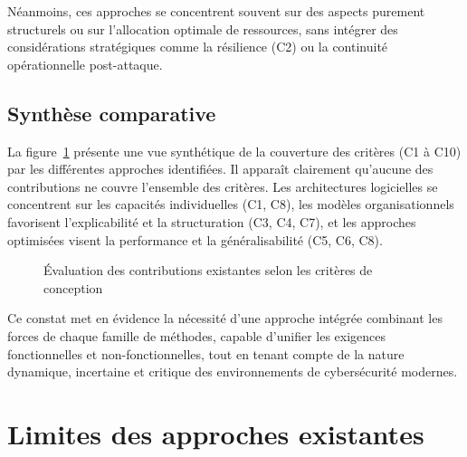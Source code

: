 \documentclass[ twoside,openright,titlepage,numbers=noenddot,headinclude,%
                footinclude=true,cleardoublepage=empty,abstractoff, %
                BCOR=5mm,paper=a4,fontsize=11pt,%
                french,american,%
                ]{scrreprt}
\begin{document}
Néanmoins, ces approches se concentrent souvent sur des aspects purement structurels ou sur l'allocation optimale de ressources, sans intégrer des considérations stratégiques comme la résilience (C2) ou la continuité opérationnelle post-attaque.

\subsection*{Synthèse comparative}

La figure~\ref{fig:revue-couverture-criteres} présente une vue synthétique de la couverture des critères (C1 à C10) par les différentes approches identifiées. Il apparaît clairement qu'aucune des contributions ne couvre l'ensemble des critères. Les architectures logicielles se concentrent sur les capacités individuelles (C1, C8), les modèles organisationnels favorisent l'explicabilité et la structuration (C3, C4, C7), et les approches optimisées visent la performance et la généralisabilité (C5, C6, C8).

\begin{figure}[h]
    \centering
    \caption{Évaluation des contributions existantes selon les critères de conception}
    \label{fig:revue-couverture-criteres}
\end{figure}

Ce constat met en évidence la nécessité d'une approche intégrée combinant les forces de chaque famille de méthodes, capable d'unifier les exigences fonctionnelles et non-fonctionnelles, tout en tenant compte de la nature dynamique, incertaine et critique des environnements de cybersécurité modernes.


\section{Limites des approches existantes}\label{sec:limits-existing}
\end{document}
